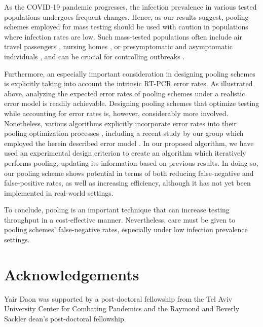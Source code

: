 \documentclass{article}
\begin{document}
As the COVID-19 pandemic progresses, the infection prevalence in
various tested populations undergoes frequent changes. Hence, as our
results suggest, pooling schemes employed for mass testing should be
used with caution in populations where infection rates are low. Such
mass-tested populations often include air travel passengers
\cite{JTM}, nursing homes \cite{DorfmanYuvalDor}, or presymptomatic
and asymptomatic individuals \cite{RobinHood}, and can be crucial for
controlling outbreaks \cite{MinaScience}.

Furthermore, an especially important consideration in designing
pooling schemes is explicitly taking into account the intrinsic RT-PCR
error rates. As illustrated above, analyzing the expected error rates
of pooling schemes under a realistic error model is readily
achievable. Designing pooling schemes that optimize testing while
accounting for error rates is, however, considerably more involved.
Nonetheless, various algorithms explicitly incorporate error rates
into their pooling optimization processes \cite{Kim,
  OptimalDorfmanPool}, including a recent study by our group which
employed the herein described error model \cite{DOPE}.  In our
proposed algorithm, we have used an experimental design criterion to
create an algorithm which iteratively performs pooling, updating its
information based on previous results. In doing so, our pooling scheme
shows potential in terms of both reducing false-negative and
false-positive rates, as well as increasing efficiency, although it
has not yet been implemented in real-world settings.

To conclude, pooling is an important technique that can increase
testing throughput in a cost-effective manner. Nevertheless, care must
be given to pooling schemes' false-negative rates, especially under
low infection prevalence settings.

\section*{Acknowledgements}
Yair Daon was supported by a post-doctoral fellowship from the Tel
Aviv University Center for Combating Pandemics and the Raymond and
Beverly Sackler dean's post-doctoral fellowship.
\end{document}
